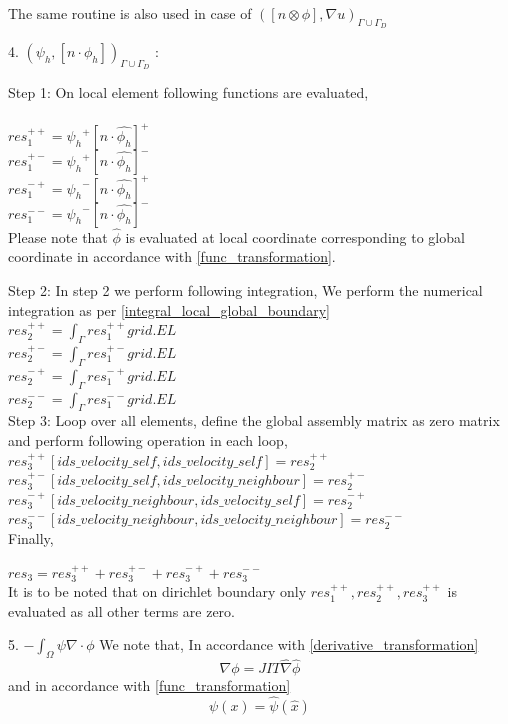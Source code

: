 \documentclass[a4paper,12pt]{book}
\begin{document}
The same routine is also used in case of $([n \otimes \phi],{\nabla u})_{\Gamma \cup \Gamma_D}$

4. $({\psi_h}, [n \cdot \phi_h])_{\Gamma \cup \Gamma_D}$ :

Step 1: On local element following functions are evaluated,\\
\\
$res_1^{++} = {\psi_h}^+ [n \cdot \hat{\phi_h}]^+$\\
$res_1^{+-} = {\psi_h}^+ [n \cdot \hat{\phi_h}]^-$\\
$res_1^{-+} = {\psi_h}^- [n \cdot \hat{\phi_h}]^+$\\
$res_1^{--} = {\psi_h}^- [n \cdot \hat{\phi_h}]^-$\\

Please note that $\hat{\phi}$ is evaluated at local coordinate corresponding to global coordinate in accordance with \ref{func_transformation}.

Step 2: In step 2 we perform following integration, 
We perform the numerical integration as per \ref{integral_local_global_boundary}
\\ 
$res_2^{++} = \int_{\Gamma} res_1^{++} grid.EL$\\
$res_2^{+-} = \int_{\Gamma} res_1^{+-} grid.EL$\\
$res_2^{-+} = \int_{\Gamma} res_1^{-+} grid.EL$\\
$res_2^{--} = \int_{\Gamma} res_1^{--} grid.EL$\\

Step 3: Loop over all elements, define the global assembly matrix as zero matrix and perform following operation in each loop,
\\
$res_3^{++}[ids\_velocity\_self,ids\_velocity\_self] = res_2^{++}$\\
$res_3^{+-}[ids\_velocity\_self,ids\_velocity\_neighbour] = res_2^{+-}$\\
$res_3^{-+}[ids\_velocity\_neighbour,ids\_velocity\_self] = res_2^{-+}$\\
$res_3^{--}[ids\_velocity\_neighbour,ids\_velocity\_neighbour] = res_2^{--}$\\

Finally,

$res_3 = res_3^{++} + res_3^{+-} + res_3^{-+} + res_3^{--}$\\

It is to be noted that on dirichlet boundary only $res_1^{++}, res_2^{++}, res_3^{++}$ is evaluated as all other terms are zero.

5. $-\int_{\Omega} \psi \nabla \cdot \phi$
We note that, In accordance with \ref{derivative_transformation}\begin{equation}
\nabla \phi = JIT \hat{\nabla} \hat{\phi}
\end{equation}
and in accordance with \ref{func_transformation}
\begin{equation}
\psi(x) = \hat{\psi} (\hat{x})
\end{equation}
\end{document}
